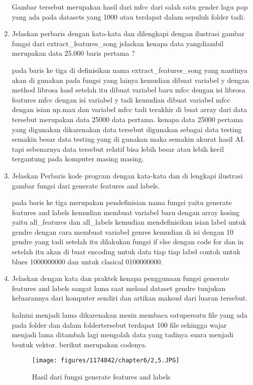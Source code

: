 \begin{enumerate}
Gambar tersebut merupakan hasil dari mfcc dari salah satu gender lagu pop yang ada pada datasets yang 1000 atau terdapat dalam sepuluh folder tadi.

\item Jelaskan perbaris dengan kata-kata dan dilengkapi dengan ilustrasi gambar fungsi dari extract\_features\_song jelaskan kenapa data yangdiambil merupakan data 25.000 baris pertama ? 



\subitem pada baris ke tiga di definisikan nama extract\_features\_song yang nantinya akan di gunakan pada fungsi yang lainya kemudian dibuat variabel y dengan method librosa load setelah itu dibuat variabel baru mfcc dengan isi librosa features mfcc dengan isi variabel y tadi kemudian dibuat variabel mfcc dengan isian np.max dan variabel mfcc tadi terakhir di buat array dari data tersebut merupakan data 25000 data pertama. kenapa data 25000 pertama yang digunakan dikarenakan data tersebut digunakan sebagai data testing semakin besar data testing yang di gunakan maka semakin akurat hasil AI. tapi sebenarnya data tersebut relatif bisa lebih besar atau lebih kecil tergantung pada komputer masing masing.

\item Jelaskan Perbaris kode program dengan kata-kata dan di lengkapi ilustrasi gambar fungsi dari generate features and labels.



\subitem pada baris ke tiga merupakan pendefinisian nama fungsi yaitu generate features and labels kemudian membuat variabel baru dengan array kosing yaitu all\_features dan all\_labels kemudian mendefinisikan isian label untuk gendre dengan cara membuat variabel genres kemudian di isi dengan 10 gendre yang tadi setelah itu dilakukan fungsi if else dengan code for dan in setelah itu akan di buat encoding untuk data tiap tiap label contoh untuk blues 1000000000 dan untuk clasical 0100000000.

\item Jelaskan dengan kata dan praktek kenapa penggunaan fungsi generate features and labels sangat lama saat meload dataset gendre tunjukan keluarannya dari komputer sendiri dan artikan maksud dari luaran tersebut.\par

halnini menjadi lama dikarenakan mesin membaca satupersatu file yang ada pada folder dan dalam foldertersebut terdapat 100 file sehingga wajar menjadi lama ditambah lagi mengolah data yang tadinya suara menjadi bentuk vektor. berikut merupakan codenya.

\begin{figure}[ht]
\centering
\texttt{[image: figures/1174042/chapter6/2,5.JPG]}
\caption{Hasil dari fungsi generate features and labels}
\label{contoh}
\end{figure}



\end{enumerate}
